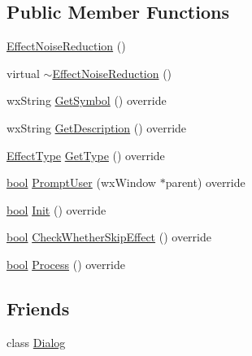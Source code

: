 \subsection*{Public Member Functions}
\begin{DoxyCompactItemize}
\item 
\hyperlink{class_effect_noise_reduction_a1c530a71216f760c44cac5f45b5565cf}{Effect\+Noise\+Reduction} ()
\item 
virtual \hyperlink{class_effect_noise_reduction_a901fa1c95e883a2b1eb9faaa4588b9f7}{$\sim$\+Effect\+Noise\+Reduction} ()
\item 
wx\+String \hyperlink{class_effect_noise_reduction_a9f1169198cf05e95a35f08fa55e16b29}{Get\+Symbol} () override
\item 
wx\+String \hyperlink{class_effect_noise_reduction_a70defa1c594f679310daf0592fe8ec0f}{Get\+Description} () override
\item 
\hyperlink{_effect_interface_8h_a4809a7bb3fd1a421902a667cc1405d43}{Effect\+Type} \hyperlink{class_effect_noise_reduction_a44d730f9baef9e72dfcaf2b1cb10578f}{Get\+Type} () override
\item 
\hyperlink{mac_2config_2i386_2lib-src_2libsoxr_2soxr-config_8h_abb452686968e48b67397da5f97445f5b}{bool} \hyperlink{class_effect_noise_reduction_acf3e51a4ac7616c6abe580f7926a5469}{Prompt\+User} (wx\+Window $\ast$parent) override
\item 
\hyperlink{mac_2config_2i386_2lib-src_2libsoxr_2soxr-config_8h_abb452686968e48b67397da5f97445f5b}{bool} \hyperlink{class_effect_noise_reduction_a0769056bb0a60c4e4b8c587e8c0b2f96}{Init} () override
\item 
\hyperlink{mac_2config_2i386_2lib-src_2libsoxr_2soxr-config_8h_abb452686968e48b67397da5f97445f5b}{bool} \hyperlink{class_effect_noise_reduction_aa157bd70741e4ea801683d4e7b37e784}{Check\+Whether\+Skip\+Effect} () override
\item 
\hyperlink{mac_2config_2i386_2lib-src_2libsoxr_2soxr-config_8h_abb452686968e48b67397da5f97445f5b}{bool} \hyperlink{class_effect_noise_reduction_a55d87b17e0396284f396f45f4be15afe}{Process} () override
\end{DoxyCompactItemize}
\subsection*{Friends}
\begin{DoxyCompactItemize}
\item 
class \hyperlink{class_effect_noise_reduction_a7f7f23419b196ad256bc2e7a8d563e25}{Dialog}
\end{DoxyCompactItemize}
